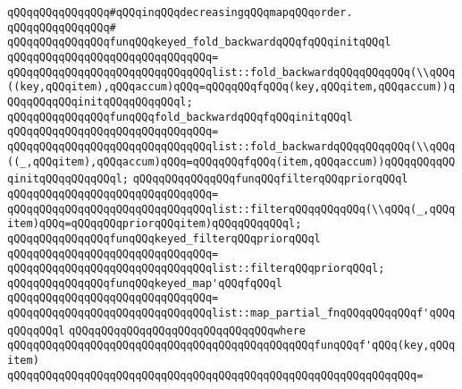 \verb|qQQqqQQqqQQqqQQq#qQQqinqQQqdecreasingqQQqmapqQQqorder.|\newline
\verb|qQQqqQQqqQQqqQQq#|\newline
\verb|qQQqqQQqqQQqqQQqfunqQQqkeyed_fold_backwardqQQqfqQQqinitqQQql|\newline
\verb|qQQqqQQqqQQqqQQqqQQqqQQqqQQqqQQq=|\newline
\verb|qQQqqQQqqQQqqQQqqQQqqQQqqQQqqQQqlist::fold_backwardqQQqqQQqqQQq(\\qQQq((key,qQQqitem),qQQqaccum)qQQq=qQQqqQQqfqQQq(key,qQQqitem,qQQqaccum))qQQqqQQqqQQqinitqQQqqQQqqQQql;|\newline
\newline
\verb|qQQqqQQqqQQqqQQqfunqQQqfold_backwardqQQqfqQQqinitqQQql|\newline
\verb|qQQqqQQqqQQqqQQqqQQqqQQqqQQqqQQq=|\newline
\verb|qQQqqQQqqQQqqQQqqQQqqQQqqQQqqQQqlist::fold_backwardqQQqqQQqqQQq(\\qQQq((_,qQQqitem),qQQqaccum)qQQq=qQQqqQQqfqQQq(item,qQQqaccum))qQQqqQQqqQQqinitqQQqqQQqqQQql;|\newline
\newline
\verb|qQQqqQQqqQQqqQQqfunqQQqfilterqQQqpriorqQQql|\newline
\verb|qQQqqQQqqQQqqQQqqQQqqQQqqQQqqQQq=|\newline
\verb|qQQqqQQqqQQqqQQqqQQqqQQqqQQqqQQqlist::filterqQQqqQQqqQQq(\\qQQq(_,qQQqitem)qQQq=qQQqqQQqpriorqQQqitem)qQQqqQQqqQQql;|\newline
\newline
\verb|qQQqqQQqqQQqqQQqfunqQQqkeyed_filterqQQqpriorqQQql|\newline
\verb|qQQqqQQqqQQqqQQqqQQqqQQqqQQqqQQq=|\newline
\verb|qQQqqQQqqQQqqQQqqQQqqQQqqQQqqQQqlist::filterqQQqpriorqQQql;|\newline
\newline
\verb|qQQqqQQqqQQqqQQqfunqQQqkeyed_map'qQQqfqQQql|\newline
\verb|qQQqqQQqqQQqqQQqqQQqqQQqqQQqqQQq=|\newline
\verb|qQQqqQQqqQQqqQQqqQQqqQQqqQQqqQQqlist::map_partial_fnqQQqqQQqqQQqf'qQQqqQQqqQQql|\newline
\verb|qQQqqQQqqQQqqQQqqQQqqQQqqQQqqQQqwhere|\newline
\verb|qQQqqQQqqQQqqQQqqQQqqQQqqQQqqQQqqQQqqQQqqQQqqQQqfunqQQqf'qQQq(key,qQQqitem)|\newline
\verb|qQQqqQQqqQQqqQQqqQQqqQQqqQQqqQQqqQQqqQQqqQQqqQQqqQQqqQQqqQQqqQQq=|\newline
